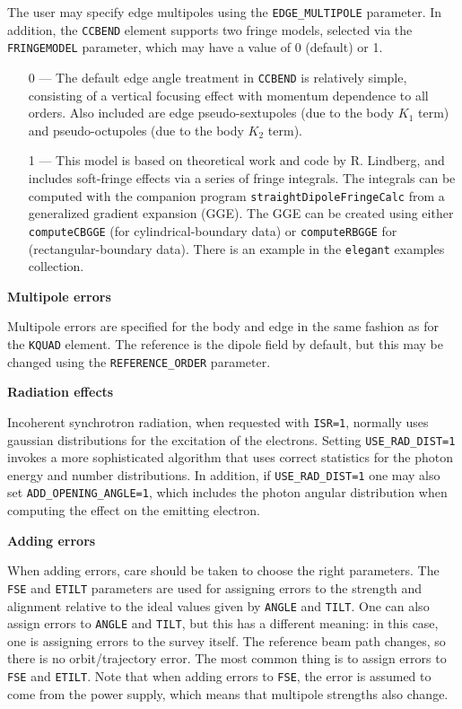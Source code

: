 The user may specify edge multipoles using the \verb|EDGE_MULTIPOLE| parameter. In addition, 
the \verb|CCBEND| element supports two fringe models, selected via the \verb|FRINGEMODEL| parameter, 
which may have a value of 0 (default) or 1.
\begin{itemize}
\item[0] --- The default edge angle treatment in \verb|CCBEND| is relatively simple, consisting of a 
vertical focusing effect with momentum dependence to all orders.
Also included are edge pseudo-sextupoles (due to the body $K_1$ term) and
pseudo-octupoles (due to the body $K_2$ term).
\item[1] --- This model is based on theoretical work and code by R. Lindberg, and includes soft-fringe
  effects via a series of fringe integrals. The integrals can be computed with the companion program
  \verb|straightDipoleFringeCalc| from a generalized gradient expansion (GGE). The  GGE can be
  created using either \verb|computeCBGGE| (for cylindrical-boundary data) or \verb|computeRBGGE|
  for (rectangular-boundary data). There is an example in the {\tt elegant} examples collection.
\end{itemize}

{\bf Multipole errors}

Multipole errors are specified for the body and edge in the same fashion as for the
\verb|KQUAD| element.
The reference is the dipole field by default, but this may be changed using the
\verb|REFERENCE_ORDER| parameter.

{\bf Radiation effects}

Incoherent synchrotron radiation, when requested with {\tt ISR=1},
normally uses gaussian distributions for the excitation of the electrons.
Setting {\tt USE\_RAD\_DIST=1} invokes a more sophisticated algorithm that
uses correct statistics for the photon energy and number distributions.
In addition, if {\tt USE\_RAD\_DIST=1} one may also set {\tt ADD\_OPENING\_ANGLE=1},
which includes the photon angular distribution when computing the effect on 
the emitting electron.  

{\bf Adding errors}

When adding errors, care should be taken to choose the right
parameters.  The \verb|FSE| and \verb|ETILT| parameters are used for
assigning errors to the strength and alignment relative to the ideal
values given by \verb|ANGLE| and \verb|TILT|.  One can also assign 
errors to \verb|ANGLE| and \verb|TILT|, but this has a different meaning:
in this case, one is assigning errors to the survey itself.  The reference
beam path changes, so there is no orbit/trajectory error. The most common
thing is to assign errors to \verb|FSE| and \verb|ETILT|.  Note that when
adding errors to \verb|FSE|, the error is assumed to come from the power
supply, which means that multipole strengths also change.

